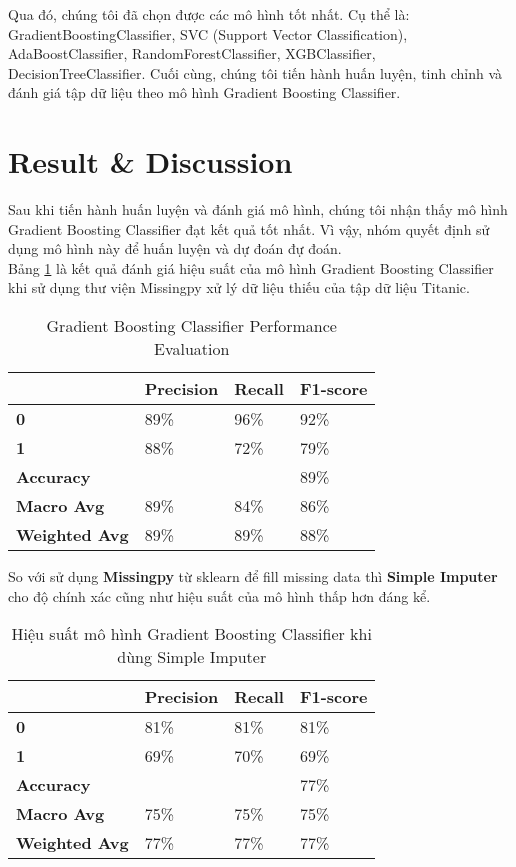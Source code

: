 \documentclass[11pt]{article}
\begin{document}
Qua đó, chúng tôi đã chọn được các mô hình tốt nhất. Cụ thể là: GradientBoostingClassifier, SVC (Support Vector Classification), AdaBoostClassifier, RandomForestClassifier, XGBClassifier, DecisionTreeClassifier. Cuối cùng, chúng tôi tiến hành huấn luyện, tinh chỉnh và đánh giá tập dữ liệu theo mô hình Gradient Boosting Classifier.
\section{Result \& Discussion}
Sau khi tiến hành huấn luyện và đánh giá mô hình, chúng tôi nhận thấy mô hình Gradient Boosting Classifier đạt kết quả tốt nhất. Vì vậy, nhóm quyết định sử dụng mô hình này để huấn luyện và dự đoán đự đoán.\\
Bảng \ref{tab:gradient_boosting_results} là kết quả đánh giá hiệu suất của mô hình Gradient Boosting Classifier khi sử dụng thư viện Missingpy xử lý dữ liệu thiếu của tập dữ liệu Titanic.\\
\begin{table}[htbp]
\centering
\caption{Gradient Boosting Classifier Performance Evaluation}
\label{tab:gradient_boosting_results}
\begin{tabular}{|l|l|l|l|}
\hline
\textbf{} & \textbf{Precision} & \textbf{Recall} & \textbf{F1-score}  \\ \hline
\textbf{0} & 89\%&96\%&92\%\\ \hline 
\textbf{1} & 88\%&72\%&79\%\\ \hline 
\textbf{Accuracy} & &  & 89\%  \\ \hline
\textbf{Macro Avg} & 89\% & 84\% & 86\%  \\ \hline
\textbf{Weighted Avg} & 89\% & 89\% & 88\%  \\ \hline
\end{tabular}
\end{table}
So với sử dụng \textbf{Missingpy} từ sklearn để fill missing data thì \textbf{Simple Imputer} cho độ chính xác cũng như hiệu suất của mô hình thấp hơn đáng kể. 
\begin{table}[htbp]
\centering
\caption{Hiệu suất mô hình Gradient Boosting Classifier khi dùng Simple Imputer}
\label{tab:simple}
\begin{tabular}{|l|l|l|l|}
\hline
\textbf{} & \textbf{Precision} & \textbf{Recall} & \textbf{F1-score} \\ \hline
\textbf{0} & 81\% & 81\% & 81\% \\ \hline 
\textbf{1} & 69\% & 70\% & 69\% \\ \hline 
\textbf{Accuracy} & & & 77\% \\ \hline
\textbf{Macro Avg} & 75\% & 75\% & 75\% \\ \hline
\textbf{Weighted Avg} & 77\% & 77\% & 77\% \\ \hline
\end{tabular}
\end{table}
\end{document}
